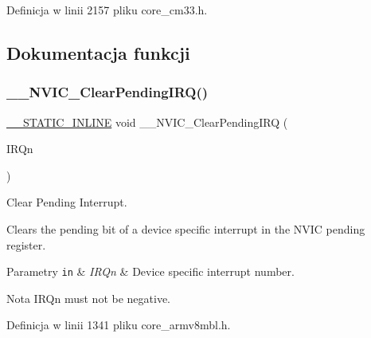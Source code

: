 Definicja w linii 2157 pliku core\+\_\+cm33.\+h.



\subsection{Dokumentacja funkcji}
\mbox{\label{group___c_m_s_i_s___core___n_v_i_c_functions_ga562a86dbdf14827d0fee8fdafb04d191}} 
\subsubsection{\texorpdfstring{\+\_\+\+\_\+\+N\+V\+I\+C\+\_\+\+Clear\+Pending\+I\+R\+Q()}{\_\_NVIC\_ClearPendingIRQ()}}
{\footnotesize\ttfamily \hyperlink{cmsis__iccarm_8h_aba87361bfad2ae52cfe2f40c1a1dbf9c}{\+\_\+\+\_\+\+S\+T\+A\+T\+I\+C\+\_\+\+I\+N\+L\+I\+NE} void \+\_\+\+\_\+\+N\+V\+I\+C\+\_\+\+Clear\+Pending\+I\+RQ (\begin{DoxyParamCaption}\item[{\hyperlink{group___peripheral__interrupt__number__definition_ga7e1129cd8a196f4284d41db3e82ad5c8}{I\+R\+Qn\+\_\+\+Type}}]{I\+R\+Qn }\end{DoxyParamCaption})}



Clear Pending Interrupt. 

Clears the pending bit of a device specific interrupt in the N\+V\+IC pending register. 
\begin{DoxyParams}[1]{Parametry}
\mbox{\tt in}  & {\em I\+R\+Qn} & Device specific interrupt number. \\
\hline
\end{DoxyParams}
\begin{DoxyNote}{Nota}
I\+R\+Qn must not be negative. 
\end{DoxyNote}


Definicja w linii 1341 pliku core\+\_\+armv8mbl.\+h.

\mbox{\label{group___c_m_s_i_s___core___n_v_i_c_functions_gae016e4c1986312044ee768806537d52f}} 
